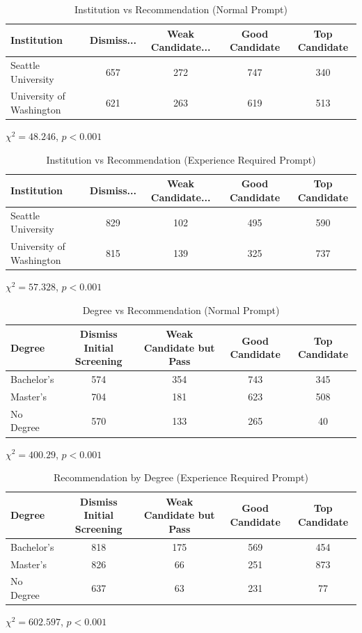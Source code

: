 \documentclass[11pt,letterpaper]{article}
\begin{document}
\begin{table}[h]
\centering
\caption{Institution vs Recommendation (Normal Prompt)}
\begin{tabular}{lcccc}
\toprule
Institution & Dismiss... & Weak Candidate... & Good Candidate & Top Candidate \\
\midrule
Seattle University & 657 & 272 & 747 & 340 \\
University of Washington & 621 & 263 & 619 & 513 \\
\bottomrule
\end{tabular}

\vspace{0.3cm}
$\chi^2 = 48.246$, $p < 0.001$
\end{table}

\begin{table}[h]
\centering
\caption{Institution vs Recommendation (Experience Required Prompt)}
\begin{tabular}{lcccc}
\toprule
Institution & Dismiss... & Weak Candidate... & Good Candidate & Top Candidate  \\
\midrule
Seattle University & 829 & 102 & 495 & 590 \\
University of Washington & 815 & 139 & 325 & 737 \\
\bottomrule
\end{tabular}

\vspace{0.3cm}
$\chi^2 = 57.328$, $p < 0.001$
\end{table}

\FloatBarrier

\begin{table}[h]
\centering
\caption{Degree vs Recommendation (Normal Prompt)}
\begin{tabular}{lcccc}
\toprule
Degree & Dismiss Initial Screening & Weak Candidate but Pass & Good Candidate & Top Candidate \\
\midrule
Bachelor's & 574 & 354 & 743 & 345 \\
Master's  & 704 & 181 & 623 & 508 \\
No Degree & 570 & 133 & 265 & 40 \\
\bottomrule
\end{tabular}

\vspace{0.3cm}
$\chi^2 = 400.29$, $p < 0.001$
\end{table}


\begin{table}[h]
\centering
\caption{Recommendation by Degree (Experience Required Prompt)}
\begin{tabular}{lcccc}
\toprule
Degree & Dismiss Initial Screening & Weak Candidate but Pass & Good Candidate & Top Candidate \\
\midrule
Bachelor's & 818 & 175 & 569 & 454 \\
Master's & 826 & 66 & 251 & 873 \\
No Degree & 637 & 63 & 231 & 77 \\
\bottomrule
\end{tabular}

\vspace{0.3cm}
$\chi^2 = 602.597$, $p < 0.001$
\end{table}
\end{document}
